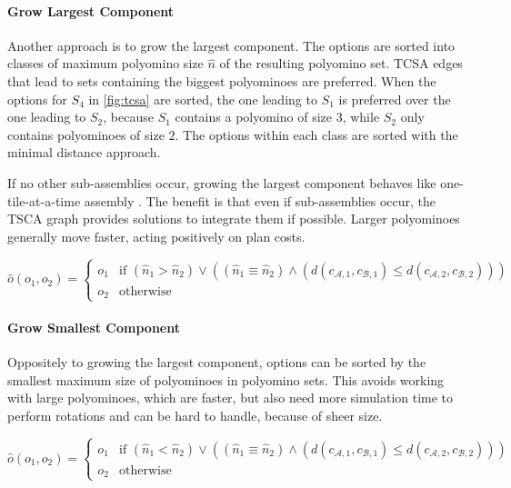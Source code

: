 \paragraph{Grow Largest Component}

Another approach is to grow the largest component.
The options are sorted into classes of maximum polyomino size $\hat{n}$ of the resulting polyomino set.
TCSA edges that lead to sets containing the biggest polyominoes are preferred.
When the options for $S_4$ in \autoref{fig:tcsa} are sorted, the one leading to $S_1$ is preferred over the one leading to $S_2$, because $S_1$ contains a polyomino of size $3$, while $S_2$ only contains polyominoes of size $2$. 
The options within each class are sorted with the minimal distance approach.

If no other sub-assemblies occur, growing the largest component behaves like one-tile-at-a-time assembly \cite{Becker2020}.
The benefit is that even if sub-assemblies occur, the TSCA graph provides solutions to integrate them if possible.
Larger polyominoes generally move faster, acting positively on plan costs.

\begin{equation}
\hat{o}(o_1, o_2) =
\begin{cases}
o_1 & \text{if } \left( \hat{n}_1 > \hat{n}_2 \right) \lor \left( \left( \hat{n}_1 \equiv \hat{n}_2 \right) \land \left( d(c_{\mathcal{A},1}, c_{\mathcal{B},1}) \leq d(c_{\mathcal{A},2}, c_{\mathcal{B},2})\right)\right) \\
o_2 & \text{otherwise}
\end{cases}
\end{equation}

\paragraph{Grow Smallest Component}

Oppositely to growing the largest component, options can be sorted by the smallest maximum size of polyominoes in polyomino sets.
This avoids working with large polyominoes, which are faster, but also need more simulation time to perform rotations and can be hard to handle, because of sheer size.

\begin{equation}
\hat{o}(o_1, o_2) =
\begin{cases}
o_1 & \text{if } \left( \hat{n}_1 < \hat{n}_2 \right) \lor \left( \left( \hat{n}_1 \equiv \hat{n}_2 \right) \land \left( d(c_{\mathcal{A},1}, c_{\mathcal{B},1}) \leq d(c_{\mathcal{A},2}, c_{\mathcal{B},2})\right)\right) \\
o_2 & \text{otherwise}
\end{cases}
\end{equation}

